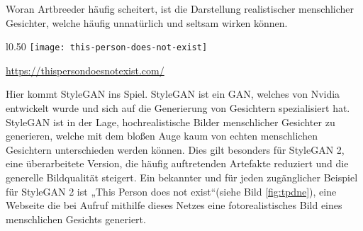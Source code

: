     
\noindent  Woran Artbreeder häufig scheitert, ist die Darstellung realistischer menschlicher Gesichter, welche häufig unnatürlich und seltsam wirken können.

\begin{wrapfigure}[18]{l}{0.50\textwidth}
    \centering
    \texttt{[image: this-person-does-not-exist]}
    \caption{KI-genertiertes Gesicht} \quelle\url{https://thispersondoesnotexist.com/}
    \label{fig:tpdne}
    \end{wrapfigure}

\hfill
\break
Hier kommt StyleGAN ins Spiel. StyleGAN ist ein GAN, welches von Nvidia entwickelt wurde und sich auf die Generierung von Gesichtern spezialisiert hat. StyleGAN ist in der Lage, hochrealistische Bilder menschlicher Gesichter zu generieren, welche mit dem bloßen Auge kaum von echten menschlichen Gesichtern unterschieden werden können. Dies gilt besonders für StyleGAN 2, eine überarbeitete Version, die häufig auftretenden Artefakte reduziert und die generelle Bildqualität steigert. Ein bekannter und für jeden zugänglicher Beispiel für StyleGAN 2 ist „This Person does not exist“(siehe Bild \ref{fig:tpdne}), eine Webseite die bei Aufruf mithilfe dieses Netzes eine fotorealistisches Bild eines menschlichen Gesichts generiert.

\newpage
